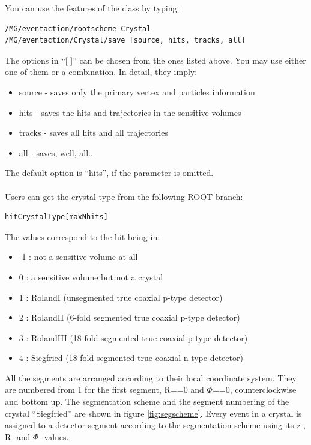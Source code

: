 You can use the features of the class by typing:
\begin{lstlisting}
/MG/eventaction/rootscheme Crystal
/MG/eventaction/Crystal/save [source, hits, tracks, all]
\end{lstlisting}
\vspace{0.2cm}
The options in ``[  ]'' can be chosen from the ones listed above. You may use either one of them or a combination. In detail, they imply:\\
\begin{itemize}
 \item source - saves only the primary vertex and particles information
 \item hits - saves the hits and trajectories in the sensitive volumes
 \item tracks - saves all hits and all trajectories
 \item all - saves, well, all..
\end{itemize}
The default option is ``hits'', if the parameter is omitted.\\
\vspace{0.2cm}\\
Users can get the crystal type from the following ROOT branch:
\begin{lstlisting}
hitCrystalType[maxNhits]
\end{lstlisting}
The values correspond to the hit being in:
\begin{itemize}
\item -1 : not a sensitive volume at all
\item  0 : a sensitive volume but not a crystal
\item  1 : RolandI (unsegmented true coaxial p-type detector)
\item  2 : RolandII (6-fold segmented true coaxial p-type detector) 
\item  3 : RolandIII (18-fold segmented true coaxial p-type detector)  
\item  4 : Siegfried (18-fold segmented true coaxial n-type detector)
\end{itemize}
\vspace{0.2cm}
All the segments are arranged according to their local coordinate system. They are numbered from 1 for the first segment, R==0 and $\Phi$==0, counterclockwise and bottom up. The segmentation scheme and the segment numbering of the crystal ``Siegfried'' are shown in figure \ref{fig:segscheme}. Every event in a crystal is assigned to a detector segment according to the segmentation scheme using its z-, R- and $\Phi$- values.\\

